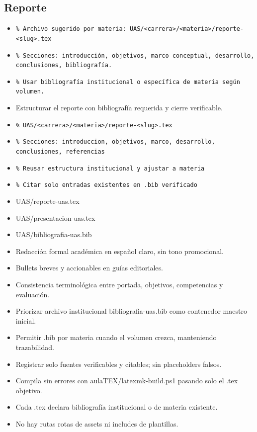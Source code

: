 \documentclass[12pt]{article}
\begin{document}
\subsection*{Reporte}
\begin{itemize}[leftmargin=*]
  \item \texttt{\% Archivo sugerido por materia: UAS/<carrera>/<materia>/reporte-<slug>.tex}
  \item \texttt{\% Secciones: introducción, objetivos, marco conceptual, desarrollo, conclusiones, bibliografía.}
  \item \texttt{\% Usar bibliografía institucional o específica de materia según volumen.}
  \item Estructurar el reporte con bibliografía requerida y cierre verificable.
  \item \texttt{\% UAS/<carrera>/<materia>/reporte-<slug>.tex}
  \item \texttt{\% Secciones: introduccion, objetivos, marco, desarrollo, conclusiones, referencias}
  \item \texttt{\% Reusar estructura institucional y ajustar a materia}
  \item \texttt{\% Citar solo entradas existentes en .bib verificado}
  \item UAS/reporte-uas.tex
  \item UAS/presentacion-uas.tex
  \item UAS/bibliografia-uas.bib
  \item Redacción formal académica en español claro, sin tono promocional.
  \item Bullets breves y accionables en guías editoriales.
  \item Consistencia terminológica entre portada, objetivos, competencias y evaluación.
  \item Priorizar archivo institucional bibliografia-uas.bib como contenedor maestro inicial.
  \item Permitir .bib por materia cuando el volumen crezca, manteniendo trazabilidad.
  \item Registrar solo fuentes verificables y citables; sin placeholders falsos.
  \item Compila sin errores con aulaTEX/latexmk-build.ps1 pasando solo el .tex objetivo.
  \item Cada .tex declara bibliografía institucional o de materia existente.
  \item No hay rutas rotas de assets ni includes de plantillas.
\end{itemize}
\end{document}

